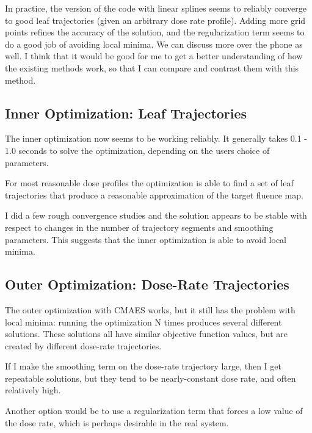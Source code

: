 In practice, the version of the code with linear splines seems to reliably converge to good leaf trajectories (given an arbitrary dose rate profile). Adding more grid points refines the accuracy of the solution, and the regularization term seems to do a good job of avoiding local minima. We can discuss more over the phone as well. I think that it would be good for me to get a better understanding of how the existing methods work, so that I can compare and contrast them with this method.

\subsection{Inner Optimization:  Leaf Trajectories}

The inner optimization now seems to be working reliably.
It generally takes 0.1 - 1.0 seconds to solve the optimization, depending on the users choice of parameters.

For most reasonable dose profiles the optimization is able to find a set of leaf trajectories
that produce a reasonable approximation of the target fluence map.

I did a few rough convergence studies and the solution appears to be stable with respect to changes
in the number of trajectory segments and smoothing parameters.
This suggests that the inner optimization is able to avoid local minima.



\subsection{Outer Optimization:  Dose-Rate Trajectories}

The outer optimization with CMAES works, but it still has the problem with local minima:
running the optimization N times produces several different solutions.
These solutions all have similar objective function values, but are created by different
dose-rate trajectories.

If I make the smoothing term on the dose-rate trajectory large, then I get repeatable solutions,
but they tend to be nearly-constant dose rate, and often relatively high.

Another option would be to use a regularization term that forces a low value of the dose rate,
which is perhaps desirable in the real system.

